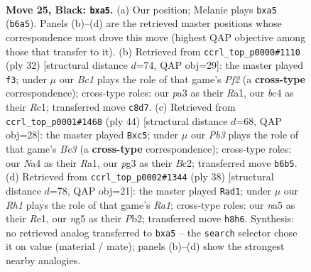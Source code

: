 \documentclass[11pt]{article}
\begin{document}
\clearpage

\begin{figure}[p]\centering
\begin{subfigure}{0.46\textwidth}\centering
\resizebox{\linewidth}{!}{%
\newchessgame
\chessboard[
  setfen={r1b3kr/8/ppn1p1p1/N3PpNp/n1B2B2/P5P1/1P3P1P/RK1R4 b - - 0 25},
  showmover=false,
  pgfstyle=straightmove, color=movearrow, markmove={b6-a5}
]}
\caption{}
\end{subfigure}\hfill
\begin{subfigure}{0.46\textwidth}\centering
\resizebox{\linewidth}{!}{%
\newchessgame
\chessboard[
  setfen={r1r2k2/1p1n1ppp/p3p3/3p1b2/3Pn2P/1BN1P3/PP3PP1/R1R1N1K1 w - - 3 17},
  showmover=false,
  pgfstyle=straightmove, color=movearrow, markmove={f2-f3}
]}
\caption{}
\end{subfigure}
\\[4pt]
\begin{subfigure}{0.46\textwidth}\centering
\resizebox{\linewidth}{!}{%
\newchessgame
\chessboard[
  setfen={2b1r1k1/5pbp/p2p2p1/2nP2N1/1rp1PP2/4B2P/1PB3P1/R3R1K1 w - - 0 23},
  showmover=false,
  pgfstyle=straightmove, color=movearrow, markmove={e3-c5}
]}
\caption{}
\end{subfigure}\hfill
\begin{subfigure}{0.46\textwidth}\centering
\resizebox{\linewidth}{!}{%
\newchessgame
\chessboard[
  setfen={r6r/pp1k2pp/1bpNbp2/4n3/7B/2P5/PPB2PPP/R3R1K1 w - - 2 20},
  showmover=false,
  pgfstyle=straightmove, color=movearrow, markmove={a1-d1}
]}
\caption{}
\end{subfigure}
\caption{\textbf{Move 25, Black: \texttt{bxa5}.} (a) Our position; Melanie plays \texttt{bxa5} (\texttt{b6a5}). Panels (b)--(d) are the retrieved master positions whose correspondence most drove this move (highest QAP objective among those that transfer to it). (b) Retrieved from \texttt{ccrl\_top\_p0000\#1110} (ply 32) [structural distance $d$=74, QAP obj=29]: the master played \texttt{f3}; under $\mu$ our \emph{Bc1} plays the role of that game's \emph{Pf2} (a \textbf{cross-type} correspondence); cross-type roles: our \emph{p}a3 as their \emph{R}a1, our \emph{b}c4 as their \emph{R}c1; transferred move \texttt{c8d7}. (c) Retrieved from \texttt{ccrl\_top\_p0001\#1468} (ply 44) [structural distance $d$=68, QAP obj=28]: the master played \texttt{Bxc5}; under $\mu$ our \emph{Pb3} plays the role of that game's \emph{Be3} (a \textbf{cross-type} correspondence); cross-type roles: our \emph{N}a4 as their \emph{R}a1, our \emph{p}g3 as their \emph{B}c2; transferred move \texttt{b6b5}. (d) Retrieved from \texttt{ccrl\_top\_p0002\#1344} (ply 38) [structural distance $d$=78, QAP obj=21]: the master played \texttt{Rad1}; under $\mu$ our \emph{Rh1} plays the role of that game's \emph{Ra1}; cross-type roles: our \emph{n}a5 as their \emph{R}e1, our \emph{n}g5 as their \emph{P}b2; transferred move \texttt{h8h6}. Synthesis: no retrieved analog transferred to \texttt{bxa5} -- the \texttt{search} selector chose it on value (material / mate); panels (b)--(d) show the strongest nearby analogies.}
\label{fig:thought-m49}
\end{figure}
\end{document}
